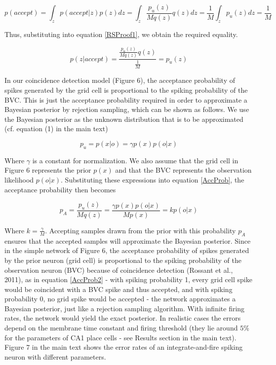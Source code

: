 \begin{equation}\label{RSProof3}
p(accept)=\int_z{p(accept|z)p(z)dz}=\int_z{\frac{p_u(z)}{Mq(z)} q(z) dz}=\frac{1}{M}\int_z{p_u(z) dz}=\frac{1}{M}
\end{equation}

Thus, substituting into equation \eqref{RSProof1}, we obtain the required equality.

\begin{equation}\label{RSProof4}
p(z|accept)=\frac{\frac{p_u(z)}{Mq(z)}q(z)}{\frac{1}{M}}=p_u(z)
\end{equation}

In our coincidence detection model (Figure 6), the acceptance probability of spikes generated by the grid cell is proportional to the spiking probability of the BVC. This is just the acceptance probability required in order to approximate a Bayesian posterior by rejection sampling, which can be shown as follows. We use the Bayesian posterior as the unknown distribution that is to be approximated (cf. equation (1) in the main text)

\begin{equation}\label{Papprox}
p_u = p(x|o) = \gamma p(x) p(o|x)
\end{equation}

Where $\gamma$ is a constant for normalization. We also assume that the grid cell in Figure 6 represents the prior $p(x)$ and that the BVC represents the observation likelihood $ p(o|x) $. Substituting these expressions into equation \eqref{AccProb}, the acceptance probability then becomes

\begin{equation}\label{AccProb2}
p_A=\frac{p_u(z)}{Mq(z)}=\frac{\gamma p(x) p(o|x)}{Mp(x)}=k p(o|x)
\end{equation}

Where $k=\frac{\gamma}{M}$. Accepting samples drawn from the prior with this probability $ p_A $ ensures that the accepted samples will approximate the Bayesian posterior. Since in the simple network of Figure 6, the acceptance probability of spikes generated by the prior neuron (grid cell) is proportional to the spiking probability of the observation neuron (BVC) because of coincidence detection (Rossant et al., 2011), as in equation \eqref{AccProb2} - with spiking probability 1, every grid cell spike would be coincident with a BVC spike and thus accepted, and with spiking probability 0, no grid spike would be accepted - the network approximates a Bayesian posterior, just like a rejection sampling algorithm. With infinite firing rates, the network would yield the exact posterior. In realistic cases the errors depend on the membrane time constant and firing threshold (they lie around $5\%$ for the parameters of CA1 place cells - see Results section in the main text). Figure 7 in the main text shows the error rates of an integrate-and-fire spiking neuron with different parameters.

